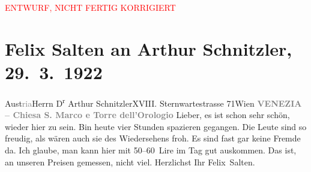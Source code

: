 
\begin{center}
            \textcolor{red}{ENTWURF, NICHT FERTIG KORRIGIERT}
                      \end{center}
            
         
         \renewcommand{\erwaehntePersonen}{Personen: Frieda Pollak}
         \renewcommand{\erwaehnteOrte}{Orte: San Marco, Stazione di Venezia Santa Lucia, Sternwartestraße, Torre dell’Orologio, Venedig, Wien, Österreich}
         \renewcommand{\erwaehnteWerke}{}
               \section[Felix Salten an Arthur Schnitzler, 29. 3. 1922]{ Felix Salten an Arthur Schnitzler, 29. 3. 1922}\nopagebreak{}\rehead{ }\begin{ledgroupsized}[t]{13cm}\normalsize\beginnumbering \toendnotes[C]{\smallbreak\pagebreak[2]} 
\pstart{}{\pb}Aust\textcolor{gray}{ria}\pend{}\pstart{}Herrn D\textsuperscript{r} Arthur Schnitzler\pend{}\pstart{}XVIII. Sternwartestrasse 71\pend{}\pstart{}Wien\pend{}{\bigskip}\pstart
           \noindent{}\centering{}{\pb}\textcolor{gray}{\textbf{VENEZIA – Chiesa S. Marco e Torre dell’Orologio}}\pend
           \pstart
           \noindent{}{\pb}Lieber, es ist schon sehr schön, wieder hier zu sein. Bin heute vier
               Stunden spazieren gegangen. Die Leute sind so freudig, als wären auch sie des
               Wiedersehens froh. Es sind fast gar keine Fremde da. Ich glaube, man kann hier mit
               50–60 Lire im Tag gut auskommen. Das ist, an unseren Preisen gemessen, nicht
               viel.\pend
           \pstart Herzlichst Ihr \spacefill\mbox{Felix Salten.}\pend{}
         

\end{ledgroupsized}
